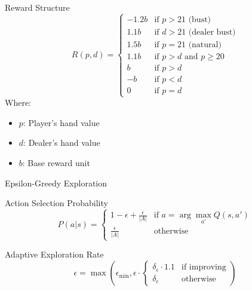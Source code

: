 \documentclass{beamer}
\begin{document}
\begin{frame}{Reward Structure}
    \begin{equation*}
        R(p,d) = \begin{cases}
        -1.2b & \text{if } p > 21 \text{ (bust)} \\
        1.1b & \text{if } d > 21 \text{ (dealer bust)} \\
        1.5b & \text{if } p = 21 \text{ (natural)} \\
        1.1b & \text{if } p > d \text{ and } p \geq 20 \\
        b & \text{if } p > d \\
        -b & \text{if } p < d \\
        0 & \text{if } p = d
        \end{cases}
    \end{equation*}
    Where:
    \begin{itemize}
        \item $p$: Player's hand value
        \item $d$: Dealer's hand value
        \item $b$: Base reward unit
    \end{itemize}
\end{frame}

\begin{frame}{Epsilon-Greedy Exploration}
    \begin{block}{Action Selection Probability}
        \begin{equation*}
            P(a|s) = \begin{cases}
            1-\epsilon + \frac{\epsilon}{|A|} & \text{if } a = \arg\max_{a'} Q(s,a') \\
            \frac{\epsilon}{|A|} & \text{otherwise}
            \end{cases}
        \end{equation*}
    \end{block}
    
    \begin{block}{Adaptive Exploration Rate}
        \begin{equation*}
            \epsilon = \max(\epsilon_{\min}, \epsilon \cdot \begin{cases}
            \delta_\epsilon \cdot 1.1 & \text{if improving} \\
            \delta_\epsilon & \text{otherwise}
            \end{cases})
        \end{equation*}
    \end{block}
\end{frame}
\end{document}
